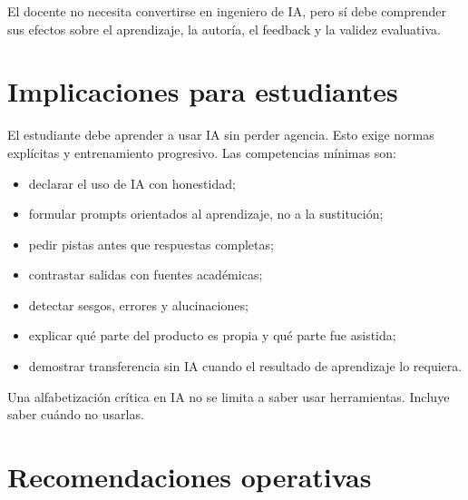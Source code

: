 \documentclass[
  spanish,
  letterpaper,
  DIV=11,
  numbers=noendperiod]{scrartcl}
\providecommand{\tightlist}{%
  \setlength{\itemsep}{0pt}\setlength{\parskip}{0pt}}
\begin{document}
El docente no necesita convertirse en ingeniero de IA, pero sí debe
comprender sus efectos sobre el aprendizaje, la autoría, el feedback y
la validez evaluativa.

\section{Implicaciones para
estudiantes}\label{implicaciones-para-estudiantes}

El estudiante debe aprender a usar IA sin perder agencia. Esto exige
normas explícitas y entrenamiento progresivo. Las competencias mínimas
son:

\begin{itemize}
\tightlist
\item
  declarar el uso de IA con honestidad;
\item
  formular prompts orientados al aprendizaje, no a la sustitución;
\item
  pedir pistas antes que respuestas completas;
\item
  contrastar salidas con fuentes académicas;
\item
  detectar sesgos, errores y alucinaciones;
\item
  explicar qué parte del producto es propia y qué parte fue asistida;
\item
  demostrar transferencia sin IA cuando el resultado de aprendizaje lo
  requiera.
\end{itemize}

Una alfabetización crítica en IA no se limita a saber usar herramientas.
Incluye saber cuándo no usarlas.

\section{Recomendaciones operativas}\label{recomendaciones-operativas}
\end{document}
